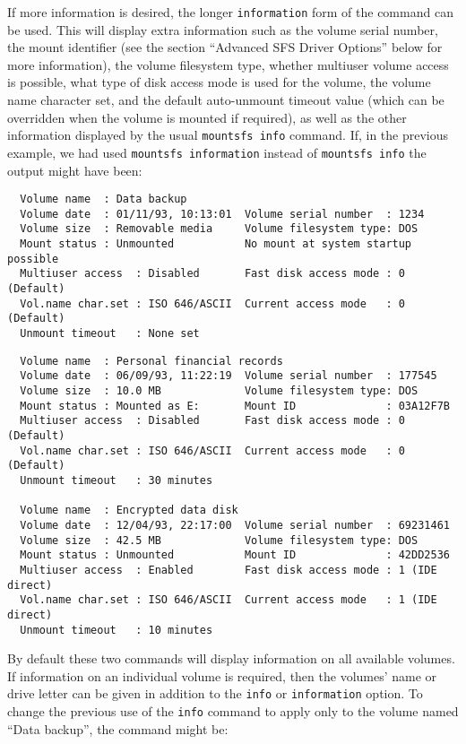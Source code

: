 If more information is desired, the longer {\tt information} form of the command
can be used.  This will display extra information such as the volume serial
number, the mount identifier (see the section ``Advanced SFS Driver Options''
below for more information), the volume filesystem type, whether multiuser
volume access is possible, what type of disk access mode is used for the
volume, the volume name character set, and the default auto-unmount timeout
value (which can be overridden when the volume is mounted if required), as well
as the other information displayed by the usual {\tt mountsfs info} command.  If, 
in the previous example, we had used {\tt mountsfs information} instead of {\tt mountsfs info}
the output might have been:
{\small
\begin{verbatim}
  Volume name  : Data backup
  Volume date  : 01/11/93, 10:13:01  Volume serial number  : 1234
  Volume size  : Removable media     Volume filesystem type: DOS
  Mount status : Unmounted           No mount at system startup possible
  Multiuser access  : Disabled       Fast disk access mode : 0 (Default)
  Vol.name char.set : ISO 646/ASCII  Current access mode   : 0 (Default)
  Unmount timeout   : None set
\end{verbatim}
\begin{verbatim}
  Volume name  : Personal financial records
  Volume date  : 06/09/93, 11:22:19  Volume serial number  : 177545
  Volume size  : 10.0 MB             Volume filesystem type: DOS
  Mount status : Mounted as E:       Mount ID              : 03A12F7B
  Multiuser access  : Disabled       Fast disk access mode : 0 (Default)
  Vol.name char.set : ISO 646/ASCII  Current access mode   : 0 (Default)
  Unmount timeout   : 30 minutes

  Volume name  : Encrypted data disk
  Volume date  : 12/04/93, 22:17:00  Volume serial number  : 69231461
  Volume size  : 42.5 MB             Volume filesystem type: DOS
  Mount status : Unmounted           Mount ID              : 42DD2536
  Multiuser access  : Enabled        Fast disk access mode : 1 (IDE direct)
  Vol.name char.set : ISO 646/ASCII  Current access mode   : 1 (IDE direct)
  Unmount timeout   : 10 minutes
\end{verbatim}

}
By default these two commands will display information on all available 
volumes. If information on an individual volume is required, then the volumes' 
name or drive letter can be given in addition to the {\tt info} or {\tt information} 
option. To change the previous use of the {\tt info} command to apply only to the 
volume named ``Data backup'', the command might be:


